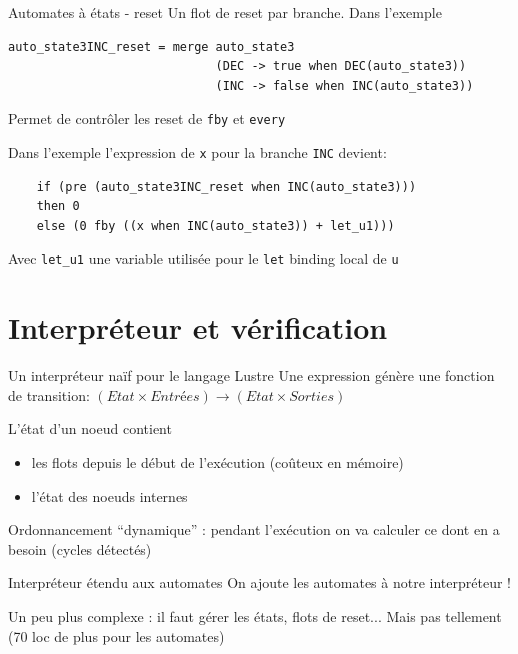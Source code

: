 \documentclass[xcolor={svgnames}]{beamer}
\begin{document}
\begin{frame}[fragile]{Automates à états - reset}
  \lstset{basicstyle=\tt\scriptsize}
  Un flot de reset par branche.
  Dans l'exemple
  \begin{lstlisting}
auto_state3INC_reset = merge auto_state3
                             (DEC -> true when DEC(auto_state3))
                             (INC -> false when INC(auto_state3))
  \end{lstlisting}
  Permet de contrôler les reset de \lstinline{fby} et \lstinline{every}

  Dans l'exemple l'expression de \lstinline{x} pour la branche \lstinline{INC} devient:
  \begin{lstlisting}
    if (pre (auto_state3INC_reset when INC(auto_state3)))
    then 0
    else (0 fby ((x when INC(auto_state3)) + let_u1)))
  \end{lstlisting}
  Avec \lstinline{let_u1} une variable utilisée pour le \lstinline{let} binding local de \lstinline{u}
\end{frame}

\section{Interpréteur et vérification}

\begin{frame}{Un interpréteur naïf pour le langage Lustre}
  Une expression génère une fonction de transition:
  $(Etat \times Entrées) \rightarrow (Etat \times Sorties)$

  L'état d'un noeud contient
  \begin{itemize}
  \item les flots depuis le début de l'exécution (coûteux en mémoire)
  \item l'état des noeuds internes
  \end{itemize}

  Ordonnancement ``dynamique'' : pendant l'exécution on va calculer ce dont en a besoin (cycles détectés)
\end{frame}

\begin{frame}{Interpréteur étendu aux automates}
  On ajoute les automates à notre interpréteur !

  Un peu plus complexe : il faut gérer les états, flots de reset... Mais pas tellement (70 loc de plus pour les automates)
\end{frame}
\end{document}

